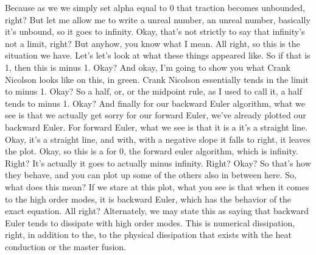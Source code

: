 \documentclass[10pt]{article}
\begin{document}
Because as we we simply set alpha equal to 0 that traction becomes unbounded, right? But let me allow me to write a unreal number, an unreal number, basically it's unbound, so it goes to infinity. Okay, that's not strictly to say that infinity's not a limit, right? But anyhow, you know what I mean. All right, so this is the situation we have. Let's let's look at what these things appeared like. So if that is 1, then this is minus 1. Okay? And okay, I'm going to show you what Crank Nicolson looks like on this, in green. Crank Nicolson essentially tends in the limit to minus 1. Okay? So a half, or, or the midpoint rule, as I used to call it, a half tends to minus 1. Okay? And finally for our backward Euler algorithm, what we see is that we actually get sorry for our forward Euler, we've already plotted our backward Euler. For forward Euler, what we see is that it is a it's a straight line. Okay, it's a straight line, and with, with a negative slope it falls to right, it leaves the plot. Okay, so this is a for 0, the forward euler algorithm, which is infinity. Right? It's actually it goes to actually minus infinity. Right? Okay? So that's how they behave, and you can plot up some of the others also in between here. So, what does this mean? If we stare at this plot, what you see is that when it comes to the high order modes, it is backward Euler, which has the behavior of the exact equation. All right? Alternately, we may state this as saying that backward Euler tends to dissipate with high order modes. This is numerical dissipation, right, in addition to the, to the physical dissipation that exists with the heat conduction or the master fusion.
\end{document}
